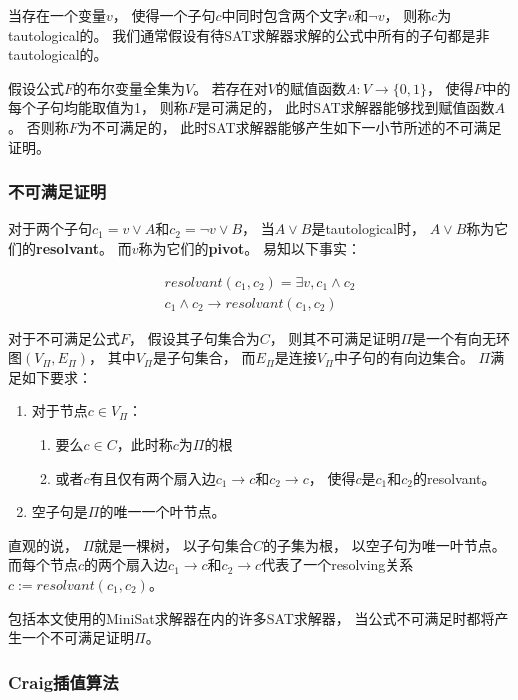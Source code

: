 当存在一个变量$v$，
使得一个子句$c$中同时包含两个文字$v$和$\neg v$，
则称$c$为tautological的。
我们通常假设有待SAT求解器求解的公式中所有的子句都是非tautological的。

假设公式$F$的布尔变量全集为$V$。
若存在对$V$的赋值函数$A:V\to \{0,1\}$，
使得$F$中的每个子句均能取值为1，
则称$F$是可满足的，
此时SAT求解器能够找到赋值函数$A$。
否则称$F$为不可满足的，
此时SAT求解器能够产生如下一小节所述的不可满足证明。

\subsubsection{不可满足证明}
对于两个子句$c_1=v\vee A$和$c_2=\neg v\vee B$，
当$A\vee B$是tautological时，
$A\vee B$称为它们的\textbf{resolvant}。
而$v$称为它们的\textbf{pivot}。
易知以下事实：

\begin{equation}
\begin{array}{ccc}
&resolvant(c_1,c_2) = \exists v, c_1\wedge c_2 &\\
&c_1\wedge c_2 \to resolvant(c_1,c_2)&
\end{array}
\end{equation}

\begin{definition}
对于不可满足公式$F$，
假设其子句集合为$C$，
则其不可满足证明$\Pi$是一个有向无环图$(V_{\Pi},E_{\Pi})$，
其中$V_{\Pi}$是子句集合，
而$E_{\Pi}$是连接$V_{\Pi}$中子句的有向边集合。
$\Pi$满足如下要求：
\begin{enumerate}
\item 对于节点$c\in V_{\Pi}$：
  \begin{enumerate}
    \item 要么$c\in C$，此时称$c$为$\Pi$的根
    \item 或者$c$有且仅有两个扇入边$c_1\to c$和$c_2\to c$，
    使得$c$是$c_1$和$c_2$的resolvant。
  \end{enumerate}
\item 空子句是$\Pi$的唯一一个叶节点。
\end{enumerate}
\end{definition}

直观的说，
$\Pi$就是一棵树，
以子句集合$C$的子集为根，
以空子句为唯一叶节点。
而每个节点$c$的两个扇入边$c_1\to c$和$c_2\to c$代表了一个resolving关系$c:=resolvant(c_1,c_2)$。

包括本文使用的MiniSat求解器在内的许多SAT求解器，
当公式不可满足时都将产生一个不可满足证明$\Pi$。

\subsubsection{Craig插值算法}


